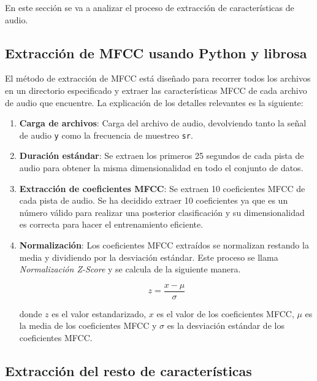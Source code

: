 En este sección se va a analizar el proceso de extracción de características de audio.

\subsection{Extracción de MFCC usando Python y librosa}

El método de extracción de MFCC está diseñado para recorrer todos los archivos en un directorio especificado y extraer las características MFCC de cada archivo de audio que encuentre. La explicación de los detalles relevantes es la siguiente:

\begin{enumerate}
\tightlist
\item \textbf{Carga de archivos}: Carga del archivo de audio, devolviendo tanto la señal de audio \texttt{y} como la frecuencia de muestreo \texttt{sr}.

\item \textbf{Duración estándar}: Se extraen los primeros 25 segundos de cada pista de audio para obtener la misma dimensionalidad en todo el conjunto de datos.

\item\textbf{Extracción de coeficientes MFCC}: Se extraen 10 coeficientes MFCC de cada pista de audio. Se ha decidido extraer 10 coeficientes ya que es un número válido para realizar una posterior clasificación y su dimensionalidad es correcta para hacer el entrenamiento eficiente.

\item \textbf{Normalización}: Los coeficientes MFCC extraídos se normalizan restando la media y dividiendo por la desviación estándar. Este proceso se llama \textit{Normalización Z-Score} y se calcula de la siguiente manera.

\begin{equation}
z = \frac{x - \mu}{\sigma}
\end{equation}

donde \(z\) es el valor estandarizado, \(x\) es el valor de los coeficientes MFCC, \(\mu\) es la media de los coeficientes MFCC y \(\sigma\) es la desviación estándar de los coeficientes MFCC.

\end{enumerate}

\subsection{Extracción del resto de características}

